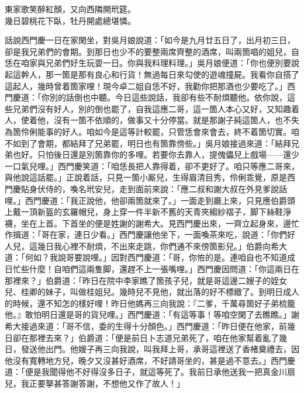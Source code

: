 \begin{myquote}
東家歌笑醉紅顏，又向西隣開玳筵。\\
幾日碧桃花下臥，牡丹開處總堪憐。
\end{myquote}

話說西門慶一日在家閑坐，對吳月娘說道：「如今是九月廿五日了，出月初三日，卻是我兄弟們的會期。到那日也少不的要整兩席齊整的酒席，叫兩箇唱的姐兒，自恁在咱家與兄弟們好生玩耍一日。你與我料理料理。」吳月娘便道：「你也便別要說起這幹人，那一箇是那有良心和行貨！無過每日來勾使的遊魂撞屍。我看你自搭了這起人，幾時曾着箇家哩！{}現今卓二姐自恁不好，我勸你把那酒也少要吃了。」西門慶道：「你別的話倒也中聽。今日這些說話，我卻有些不耐煩聽他。依你說，這些兄弟們沒有好人，別的倒也罷了，自我這應二哥，這一箇人本心又好，又知趣着人，{}使着他，沒有一箇不依順的，做事又十分停當。就是那謝子純這箇人，也不失為箇伶俐能事的好人。咱如今是這等計較罷，只管恁會來會去，終不着箇切實。咱不如到了會期，都結拜了兄弟罷，明日也有箇靠傍些。」吳月娘接過來道：「結拜兄弟也好。只怕後日還是別箇靠你的多哩。若要你去靠人，提傀儡兒上戲場——還少一口氣兒哩。」西門慶笑道：「咱恁長把人靠得着，卻不更好了。咱只等應二哥來，與他說這話罷。」正說着話，只見一箇小厮兒，生得眉清目秀，伶俐乖覺，原是西門慶貼身伏侍的，喚名玳安兒，走到面前來說：「應二叔和謝大叔在外見爹說話哩。」西門慶道：「我正說他，他卻兩箇就來了。」一面走到廳上來，只見應伯爵頭上戴一頂新盔的玄羅帽兒，身上穿一件半新不舊的天青夾縐紗褶子，脚下絲鞋淨襪，坐在上首。下首坐的便是姓謝的謝希大。見西門慶出來，一齊立起身來，邊忙作揖道：「哥在家，連日少看。」西門慶讓他坐下，一面喚茶來吃，說道：「你們好人兒，這幾日我心裡不耐煩，不出來走跳，你們通不來傍箇影兒。」伯爵向希大道：「何如？我說哥要說哩。」因對西門慶道：「哥，你恠的是。連咱自也不知道成日忙些什麼！自咱們這兩隻脚，還趕不上一張嘴哩。」西門慶因問道：「你這兩日在那裡來？」伯爵道：「昨日在院中李家瞧了箇孩子兒，就是哥這邊二嫂子的姪女兒、桂卿的妹子，叫做桂姐兒。幾時兒不見他，就出落的好不標緻了。到明日成人的時候，還不知怎的樣好哩！昨日他媽再三向我說：『二爹，千萬尋箇好子弟梳籠他。』敢怕明日還是哥的貨兒哩。」{}西門慶道：「有這等事！等咱空閑了去瞧瞧。」謝希大接過來道：「哥不信，委的生得十分顏色。」西門慶道：「昨日便在他家，前幾日卻在那裡去來？」伯爵道：「便是前日卜志道兄弟死了，咱在他家幫着亂了幾日，發送他出門。{}他嫂子再三向我說，叫我拜上哥，承哥這裡送了香楮奠禮去，因他沒有寬轉地方兒，晚夕又沒甚好酒席，不好請哥坐的，甚是過不意去。」西門慶道：「便是我聞得他不好得沒多日子，就這等死了。我前日承他送我一把真金川扇兒，我正要拏甚答謝答謝，不想他又作了故人！」

